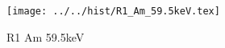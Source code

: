 \begin{figure}[h] \centering\texttt{[image: ../../hist/R1\_Am\_59.5keV.tex]}\caption{R1 Am 59.5keV}\label{hist:R1_Am_59.5keV} \end{figure}
